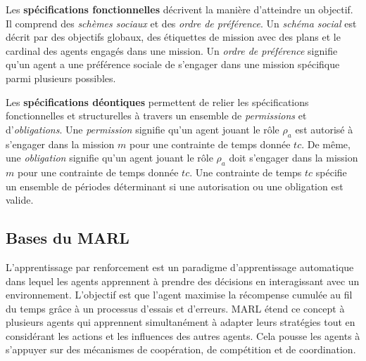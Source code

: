 \documentclass[contribution]{jfsma}
\begin{document}
Les \textbf{spécifications fonctionnelles} décrivent la manière d'atteindre un objectif. Il comprend des \emph{schèmes sociaux} et des \emph{ordre de préférence}. Un \emph{schéma social} est décrit par des objectifs globaux, des étiquettes de mission avec des plans et le cardinal des agents engagés dans une mission. Un \emph{ordre de préférence} signifie qu'un agent a une préférence sociale de s'engager dans une mission spécifique parmi plusieurs possibles.

Les \textbf{spécifications déontiques} permettent de relier les spécifications fonctionnelles et structurelles à travers un ensemble de \emph{permissions} et d'\emph{obligations}. Une \emph{permission} signifie qu'un agent jouant le rôle $\rho_a$ est autorisé à s'engager dans la mission $m$ pour une contrainte de temps donnée $tc$. De même, une \emph{obligation} signifie qu'un agent jouant le rôle $\rho_a$ doit s'engager dans la mission $m$ pour une contrainte de temps donnée $tc$. Une contrainte de temps $tc $ spécifie un ensemble de périodes déterminant si une autorisation ou une obligation est valide.


\subsection{Bases du MARL}

L'apprentissage par renforcement est un paradigme d'apprentissage automatique dans lequel les agents apprennent à prendre des décisions en interagissant avec un environnement. L’objectif est que l’agent maximise la récompense cumulée au fil du temps grâce à un processus d’essais et d’erreurs.
MARL étend ce concept à plusieurs agents qui apprennent simultanément à adapter leurs stratégies tout en considérant les actions et les influences des autres agents. Cela pousse les agents à s’appuyer sur des mécanismes de coopération, de compétition et de coordination.
\end{document}
